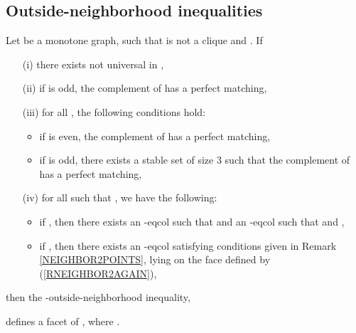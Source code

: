 \subsection{Outside-neighborhood inequalities}

\begin{tthm} \label{TNEIGHBOR2}
Let  be a monotone graph,  such that  is not a clique and .
If
\begin{enumerate}
\item[(i)] there exists  not universal in , 
\item[(ii)] if  is odd, the complement of  has a perfect matching,
\item[(iii)] for all , the following conditions hold:
\begin{itemize}
\item if  is even, the complement of  has a perfect matching,
\item if  is odd, there exists a stable set  of size 3 such that
the complement of  has a perfect matching, \end{itemize}
\item[(iv)] for all  such that , we have the following:
\begin{itemize}
\item if , then there exists an -eqcol such that
       and an -eqcol such that  and ,
\item if , then there exists an -eqcol satisfying conditions given in Remark \ref{NEIGHBOR2POINTS}, \ie lying on the face defined by (\ref{RNEIGHBOR2AGAIN}),
\end{itemize}
\end{enumerate}
then the -outside-neighborhood inequality, \ie

defines a facet of , where .
\end{tthm}

